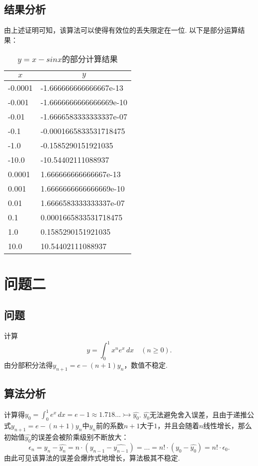 \documentclass[UTF8,ctexart,a4paper,11pt,openany]{article}
\theoremstyle{definition}
\begin{document}
    \subsection{结果分析}%
    由上述证明可知，该算法可以使得有效位的丢失限定在一位. 以下是部分运算结果：
    \begin{table}[H]
        \centering
        \begin{tabular}{ll}
            \toprule
            \multicolumn{1}{c}{$x$} & \multicolumn{1}{c}{$y$}   \\ \midrule
            -0.0001               & -1.666666666666667e-13  \\
            -0.001                & -1.6666666666666669e-10 \\
            -0.01                 & -1.6666583333333337e-07 \\
            -0.1                  & -0.0001665833531718475  \\
            -1.0                  & -0.1585290151921035     \\
            -10.0                 & -10.54402111088937      \\
            0.0001                & 1.666666666666667e-13   \\
            0.001                 & 1.6666666666666669e-10  \\
            0.01                  & 1.6666583333333337e-07  \\
            0.1                   & 0.0001665833531718475   \\
            1.0                   & 0.1585290151921035      \\
            10.0                  & 10.54402111088937       \\ \bottomrule
        \end{tabular}
        \caption{$y=x-sinx$的部分计算结果}
        \label{tab:my-table}
    \end{table}
\section{问题二} 
    \subsection{问题}
    计算$$y=\int_{0}^{1} x^ne^x \,dx \quad (n\geqslant 0). $$\indent 由分部积分法得$y_{n+1} = e-(n+1)y_n$，数值不稳定.
    \subsection{算法分析}
    计算得$y_0=\int_{0}^{1} e^x\,dx=e-1\approx 1.718\dots\rightarrowtail \hat{y_0}$. $\hat{y_0}$无法避免舍入误差，且由于递推公式$y_{n+1} = e-(n+1)y_n$中$y_n$前的系数$n+1$大于$1$，并且会随着$n$线性增长，那么初始值$\hat{y_0}$的误差会被阶乘级别不断放大：
    $$\epsilon_n=y_n-\hat{y_n}=n\cdot (y_{n-1}-\hat{y_{n-1}})=\dots=n!\cdot (y_0-\hat{y_0})=n!\cdot \epsilon_0.$$\indent 由此可见该算法的误差会爆炸式地增长，算法极其不稳定.
\end{document}
